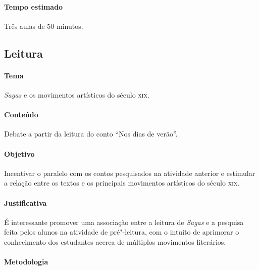 \documentclass[12pt]{extarticle}
\begin{document}

\paragraph{Tempo estimado} Três aulas de 50 minutos.


\subsection{Leitura}

\paragraph{Tema} \emph{Sagas} e os movimentos artísticos do século \textsc{xix}.

\paragraph{Conteúdo} Debate a partir da leitura do conto ``Nos dias de verão''.

\paragraph{Objetivo} Incentivar o paralelo com os contos pesquisados na atividade anterior
e estimular a relação entre os textos e os principais movimentos artísticos do século \textsc{xix}.

\paragraph{Justificativa} É interessante promover uma associação entre a leitura de \emph{Sagas} 
e a pesquisa feita pelos alunos na atividade de pré"-leitura, com o intuito de aprimorar
o conhecimento dos estudantes acerca de múltiplos movimentos literários.

\paragraph{Metodologia}
\end{document}
